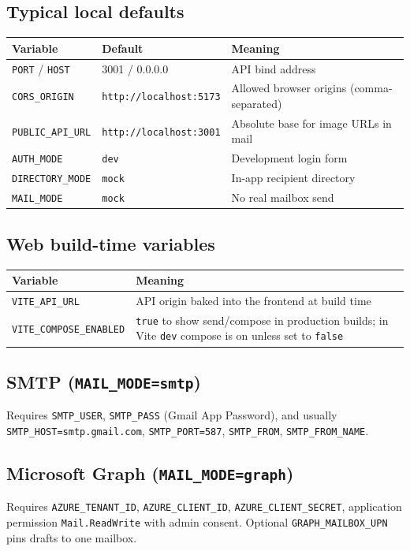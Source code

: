 \documentclass[11pt,a4paper]{article}
\begin{document}
\subsection{Typical local defaults}
\begin{tabularx}{\textwidth}{llX}
  \toprule
  \textbf{Variable} & \textbf{Default} & \textbf{Meaning} \\
  \midrule
  \texttt{PORT} / \texttt{HOST} & 3001 / 0.0.0.0 & API bind address \\
  \texttt{CORS\_ORIGIN} & \texttt{http://localhost:5173} & Allowed browser origins (comma-separated) \\
  \texttt{PUBLIC\_API\_URL} & \texttt{http://localhost:3001} & Absolute base for image URLs in mail \\
  \texttt{AUTH\_MODE} & \texttt{dev} & Development login form \\
  \texttt{DIRECTORY\_MODE} & \texttt{mock} & In-app recipient directory \\
  \texttt{MAIL\_MODE} & \texttt{mock} & No real mailbox send \\
  \bottomrule
\end{tabularx}

\subsection{Web build-time variables}
\begin{tabularx}{\textwidth}{lX}
  \toprule
  \textbf{Variable} & \textbf{Meaning} \\
  \midrule
  \texttt{VITE\_API\_URL} & API origin baked into the frontend at build time \\
  \texttt{VITE\_COMPOSE\_ENABLED} & \texttt{true} to show send/compose in production builds; in Vite \texttt{dev} compose is on unless set to \texttt{false} \\
  \bottomrule
\end{tabularx}

\subsection{SMTP (\texttt{MAIL\_MODE=smtp})}
Requires \texttt{SMTP\_USER}, \texttt{SMTP\_PASS} (Gmail App Password), and usually \texttt{SMTP\_HOST=smtp.gmail.com}, \texttt{SMTP\_PORT=587}, \texttt{SMTP\_FROM}, \texttt{SMTP\_FROM\_NAME}.

\subsection{Microsoft Graph (\texttt{MAIL\_MODE=graph})}
Requires \texttt{AZURE\_TENANT\_ID}, \texttt{AZURE\_CLIENT\_ID}, \texttt{AZURE\_CLIENT\_SECRET}, application permission \texttt{Mail.ReadWrite} with admin consent. Optional \texttt{GRAPH\_MAILBOX\_UPN} pins drafts to one mailbox.
\end{document}
